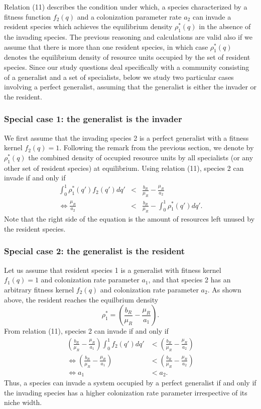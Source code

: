 \documentclass[8pt,a4paper]{article}
\begin{document}
Relation (11) describes the condition under which, a species characterized by a fitness function $f_2(q)$ and a colonization parameter rate $a_2$ can invade a resident species which achieves the equilibrium density $\rho_1^*(q)$ in the absence of the invading species. The previous reasoning and calculations are valid also if we assume that there is more than one resident species, in which case $\rho_1^*(q)$ denotes the equilibrium density of resource units occupied by the set of resident species. Since our study questions deal specifically with a community consisting of a generalist and a set of specialists, below we study two particular cases involving a perfect generalist, assuming that the generalist is either the invader or the resident.

\subsubsection{Special case 1: the generalist is the invader}

We first assume that the invading species 2 is a perfect generalist with a fitness kernel $ f_2(q)=1.$  Following the remark from the previous section, we denote by $\rho_1^*(q)$ the combined density of occupied resource units by all specialists (or any other set of resident species) at equilibrium. Using relation (11), species 2 can invade if and only if
\begin{eqnarray}
  \int_0^1 \rho_1^*(q') f_2(q') dq' & < & \frac{b_R}{\mu_R} -\frac{\mu_R}{a_2} \nonumber\\
 \Leftrightarrow  \frac{\mu_R}{a_2} & < & \frac{b_R}{\mu_R} -  \int_0^1 \rho_1^*(q') dq'.
\end{eqnarray}
Note that the right side of the equation is the amount of resources left unused by the resident species.

\subsubsection{Special case 2: the generalist is the resident}

Let us assume that resident species 1 is a generalist with fitness kernel $ f_1(q)=1$ and colonization rate parameter $a_1$, and that species 2 has an arbitrary fitness kernel $f_2(q)$ and colonization rate parameter $a_2$. As shown above, the resident reaches the equilbrium density
 $$\rho_1^* = \left(\frac{b_R}{\mu_R}- \frac{\mu_R}{a_1} \right).$$ 
From relation (11), species 2 can invade if and only if
\begin{align}
 \left( \frac{b_R}{\mu_R}- \frac{\mu_R}{a_1} \right) \int_0^1 f_2(q') dq' &<   \left(  \frac{b_R}{\mu_R} -\frac{\mu_R}{a_2} \right) \nonumber\\
 \Leftrightarrow \left( \frac{b_R}{\mu_R}- \frac{\mu_R}{a_1} \right) &< \left( \frac{b_R}{\mu_R} -\frac{\mu_R}{a_2} \right) \nonumber\\
 \Leftrightarrow   a_1 &< a_2.
\end{align} 
Thus, a species can invade a system occupied by a perfect generalist if and only if the invading species has a higher colonization rate parameter irrespective of its niche width.
\end{document}

